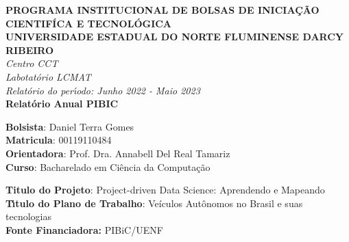 \documentclass[
	12pt,				%
	openany, %
	a4paper,			%
	english,			%
	french,				%
	spanish,			%
	brazil				%
	]{abntex2}
\begin{document}
\begin{center}
\large
\textbf{PROGRAMA INSTITUCIONAL DE BOLSAS DE INICIA\c{C}\~{A}O CIENTIF\'{I}CA E TECNOL\'{O}GICA\\\vspace{0,5cm}
UNIVERSIDADE ESTADUAL DO NORTE FLUMINENSE DARCY RIBEIRO\\
}
\textit{Centro CCT \\
Labotat\'{o}rio LCMAT\\
\vspace{1cm}
Relat\'{o}rio do per\'{\i}odo: Junho 2022 - Maio 2023}\\
\vspace{1,5cm}
\textbf{Relat\'{o}rio Anual PIBIC}\\\vspace{5cm}
\end{center}
\textbf{Bolsista}: Daniel Terra Gomes\\
\textbf{Matricula}: 00119110484\\
\textbf{Orientadora}: Prof. Dra. Annabell Del Real Tamariz  \\
\textbf{Curso}: Bacharelado em Ci\^{e}ncia da Computa\c{c}\~{a}o\\
\vspace{3cm}
\begin{center}
\textbf{Titulo do Projeto}: Project-driven Data Science: Aprendendo e Mapeando\\
\textbf{T\'{\i}tulo do Plano de Trabalho}: Veículos Autônomos no Brasil e suas tecnologias\\
\textbf{Fonte Financiadora:} PIBiC/UENF
\end{center}




\frenchspacing




\end{document}
